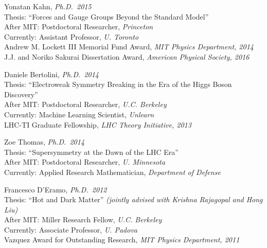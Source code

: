 \item Yonatan Kahn, \emph{Ph.D.~2015}
\\ Thesis: ``Forces and Gauge Groups Beyond the Standard Model''
\\ After MIT: Postdoctoral Researcher, \emph{Princeton}
\\ Currently: Assistant Professor, \emph{U. Toronto}
\\ Andrew M. Lockett III Memorial Fund Award, \emph{MIT Physics Department, 2014}
\\ J.J. and Noriko Sakurai Dissertation Award, \emph{American Physical Society, 2016}

\item Daniele Bertolini, \emph{Ph.D.~2014}
\\ Thesis: ``Electroweak Symmetry Breaking in the Era of the Higgs Boson Discovery''
\\ After MIT: Postdoctoral Researcher, \emph{U.C. Berkeley}
\\ Currently: Machine Learning Scientist, \emph{Unlearn}
\\ LHC-TI Graduate Fellowship, \emph{LHC Theory Initiative, 2013}

\item Zoe Thomas, \emph{Ph.D.~2014}
\\ Thesis: ``Supersymmetry at the Dawn of the LHC Era''
\\ After MIT: Postdoctoral Researcher, \emph{U. Minnesota}
\\ Currently: Applied Research Mathematician, \emph{Department of Defense}

\item Francesco D'Eramo, \emph{Ph.D.~2012}
\\ Thesis: ``Hot and Dark Matter'' \emph{(jointly advised with Krishna Rajagopal and Hong Liu)}
\\ After MIT: Miller Research Fellow, \emph{U.C. Berkeley}
\\ Currently: Associate Professor, \emph{U. Padova}
\\ Vazquez Award for Outstanding Research, \emph{MIT Physics Department, 2011}

\el
